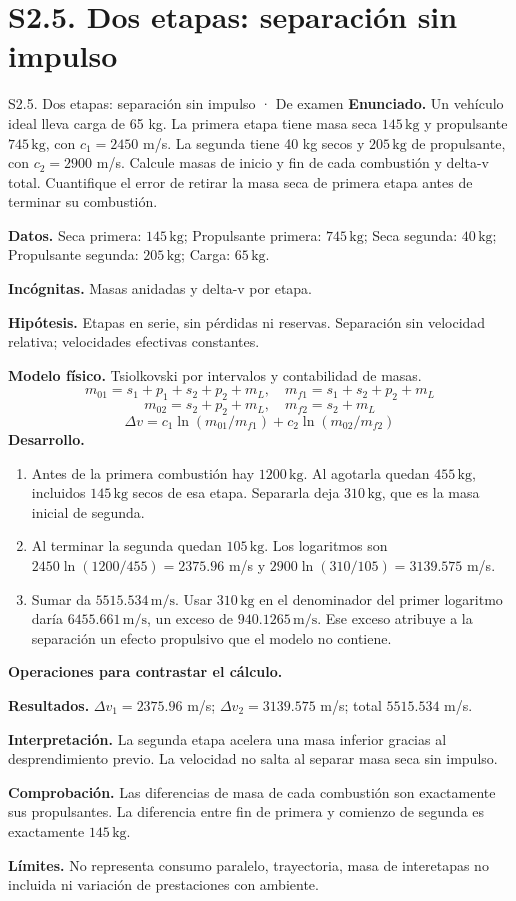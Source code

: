 \section{S2.5. Dos etapas: separación sin impulso}
\begin{studiumworked}{S2.5. Dos etapas: separación sin impulso · De examen}
\textbf{Enunciado.} Un vehículo ideal lleva carga de 65 kg. La primera etapa tiene masa seca $145\,\mathrm{kg}$ y propulsante $745\,\mathrm{kg}$, con $c_1=2450$ m/s. La segunda tiene 40 kg secos y $205\,\mathrm{kg}$ de propulsante, con $c_2=2900$ m/s. Calcule masas de inicio y fin de cada combustión y delta-v total. Cuantifique el error de retirar la masa seca de primera etapa antes de terminar su combustión.

\textbf{Datos.} Seca primera: $145\,\mathrm{kg}$; Propulsante primera: $745\,\mathrm{kg}$; Seca segunda: $40\,\mathrm{kg}$; Propulsante segunda: $205\,\mathrm{kg}$; Carga: $65\,\mathrm{kg}$.

\textbf{Incógnitas.} Masas anidadas y delta-v por etapa.

\textbf{Hipótesis.} Etapas en serie, sin pérdidas ni reservas. Separación sin velocidad relativa; velocidades efectivas constantes.

\textbf{Modelo físico.} Tsiolkovski por intervalos y contabilidad de masas.
\[m_{01}=s_1+p_1+s_2+p_2+m_L,\quad m_{f1}=s_1+s_2+p_2+m_L\]
\[m_{02}=s_2+p_2+m_L,\quad m_{f2}=s_2+m_L\]
\[\Delta v=c_1\ln(m_{01}/m_{f1})+c_2\ln(m_{02}/m_{f2})\]
\textbf{Desarrollo.}
\begin{enumerate}
\item Antes de la primera combustión hay $1200\,\mathrm{kg}$. Al agotarla quedan $455\,\mathrm{kg}$, incluidos $145\,\mathrm{kg}$ secos de esa etapa. Separarla deja $310\,\mathrm{kg}$, que es la masa inicial de segunda.
\item Al terminar la segunda quedan $105\,\mathrm{kg}$. Los logaritmos son $2450\ln(1200/455)=2375.96$ m/s y $2900\ln(310/105)=3139.575$ m/s.
\item Sumar da $5515.534\,\mathrm{m/s}$. Usar $310\,\mathrm{kg}$ en el denominador del primer logaritmo daría $6455.661\,\mathrm{m/s}$, un exceso de $940.1265\,\mathrm{m/s}$. Ese exceso atribuye a la separación un efecto propulsivo que el modelo no contiene.
\end{enumerate}
\textbf{Operaciones para contrastar el cálculo.}

\textbf{Resultados.} $\Delta v_1=2375.96$ m/s; $\Delta v_2=3139.575$ m/s; total $5515.534$ m/s.

\textbf{Interpretación.} La segunda etapa acelera una masa inferior gracias al desprendimiento previo. La velocidad no salta al separar masa seca sin impulso.

\textbf{Comprobación.} Las diferencias de masa de cada combustión son exactamente sus propulsantes. La diferencia entre fin de primera y comienzo de segunda es exactamente $145\,\mathrm{kg}$.

\textbf{Límites.} No representa consumo paralelo, trayectoria, masa de interetapas no incluida ni variación de prestaciones con ambiente.
\end{studiumworked}
